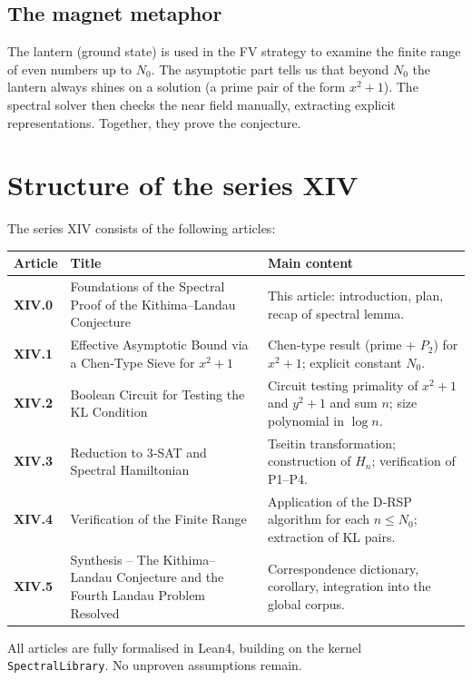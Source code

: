 \documentclass[11pt,a4paper]{article}
\begin{document}
\subsection{The magnet metaphor}

The lantern (ground state) is used in the FV strategy to examine the finite range of even numbers up to \(N_0\). The asymptotic part tells us that beyond \(N_0\) the lantern always shines on a solution (a prime pair of the form \(x^2+1\)). The spectral solver then checks the near field manually, extracting explicit representations. Together, they prove the conjecture.

\section{Structure of the series XIV}

The series XIV consists of the following articles:

\begin{center}
\small
\begin{tabular}{@{}>{\bfseries}l>{\raggedright\arraybackslash}p{4.5cm}>{\raggedright\arraybackslash}p{6cm}@{}}
\toprule
\textbf{Article} & \textbf{Title} & \textbf{Main content} \\
\midrule
XIV.0 & Foundations of the Spectral Proof of the Kithima–Landau Conjecture & This article: introduction, plan, recap of spectral lemma. \\
XIV.1 & Effective Asymptotic Bound via a Chen‑Type Sieve for \(x^{2}+1\) & Chen‑type result (prime + \(P_2\)) for \(x^2+1\); explicit constant \(N_0\). \\
XIV.2 & Boolean Circuit for Testing the KL Condition & Circuit testing primality of \(x^2+1\) and \(y^2+1\) and sum \(n\); size polynomial in \(\log n\). \\
XIV.3 & Reduction to 3‑SAT and Spectral Hamiltonian & Tseitin transformation; construction of \(H_n\); verification of P1–P4. \\
XIV.4 & Verification of the Finite Range & Application of the D‑RSP algorithm for each \(n \le N_0\); extraction of KL pairs. \\
XIV.5 & Synthesis – The Kithima–Landau Conjecture and the Fourth Landau Problem Resolved & Correspondence dictionary, corollary, integration into the global corpus. \\
\bottomrule
\end{tabular}
\normalsize
\end{center}

All articles are fully formalised in Lean4, building on the kernel \texttt{SpectralLibrary}. No unproven assumptions remain.
\end{document}
